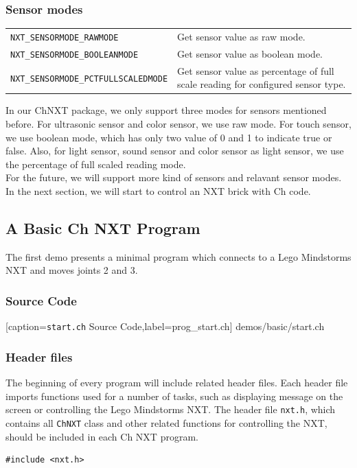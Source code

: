 \documentclass[11pt]{article}
\begin{document}
\subsubsection*{Sensor modes}
\begin{longtable}{p{6cm}p{9.5cm}}
    \hline
    {\tt NXT\_SENSORMODE\_RAWMODE}          &Get sensor value as raw mode.\\	 
    {\tt NXT\_SENSORMODE\_BOOLEANMODE}      &Get sensor value as boolean mode.\\
    {\tt NXT\_SENSORMODE\_PCTFULLSCALEDMODE}&Get sensor value as percentage of 
    full scale reading for configured sensor type.\\
    \hline
\end{longtable}
In our ChNXT package, we only support three modes for sensors mentioned before.
For ultrasonic sensor and color sensor, we use raw mode. For touch sensor, we 
use boolean mode, which has only two value of 0 and 1 to indicate true or false. 
Also, for light sensor, sound sensor and color sensor as light sensor, we use
the percentage of full scaled reading mode.\\

For the future, we will support more kind of sensors and relavant sensor modes.
In the next section, we will start to control an NXT brick with Ch code.

\subsection{\label{sec:basic_demo}A Basic Ch NXT Program}
The first demo presents a minimal program which connects to a Lego Mindstorms NXT 
and moves joints 2 and 3.

\subsubsection*{Source Code}

    [caption={{\tt start.ch} Source Code},label=prog_start.ch]
    {demos/basic/start.ch}

\subsubsection*{Header files}
The beginning of every program will include related header files. Each header file 
imports functions used for a number of tasks, such as displaying message on the 
screen or controlling the Lego Mindstorms NXT. The header file {\tt nxt.h}, which 
contains all {\tt ChNXT} class and other related functions for controlling the 
NXT, should be included in each Ch NXT program.
\begin{lstlisting}
#include <nxt.h>
\end{lstlisting}
\end{document}

